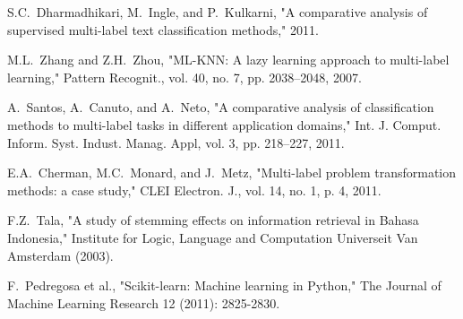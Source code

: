 \documentclass[conference]{IEEEtran}
\begin{document}
\begin{thebibliography}{1}
S.C.~Dharmadhikari, M.~Ingle, and P.~Kulkarni,
    "A comparative analysis of supervised multi-label text classification methods,"
    2011.

M.L.~Zhang and Z.H.~Zhou,
    "ML-KNN: A lazy learning approach to multi-label learning,"
    Pattern Recognit., vol. 40, no. 7, pp. 2038–2048, 2007.

A.~Santos, A.~Canuto, and A.~Neto,
    "A comparative analysis of classification methods to multi-label tasks in different application domains,"
    Int. J. Comput. Inform. Syst. Indust. Manag. Appl, vol. 3,
    pp. 218–227, 2011.

E.A.~Cherman, M.C.~Monard, and J.~Metz,
    "Multi-label problem transformation methods: a case study,"
    CLEI Electron. J., vol. 14, no. 1, p. 4, 2011.
    
F.Z.~Tala,
    "A study of stemming effects on information retrieval in Bahasa Indonesia,"
    Institute for Logic, Language and Computation Universeit Van Amsterdam (2003).
    
F.~Pedregosa et al.,
    "Scikit-learn: Machine learning in Python,"
    The Journal of Machine Learning Research 12 (2011): 2825-2830.

\end{thebibliography}





%
%
\end{document}

